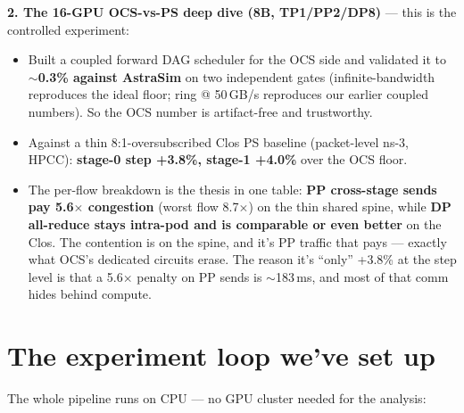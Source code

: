 \documentclass[11pt]{article}
\begin{document}
\textbf{2. The 16-GPU OCS-vs-PS deep dive (8B, TP1/PP2/DP8)} --- this is the controlled experiment:
\begin{itemize}
\item Built a coupled forward DAG scheduler for the OCS side and validated it to \textbf{$\sim$0.3\% against AstraSim} on two independent gates (infinite-bandwidth reproduces the ideal floor; ring @ 50\,GB/s reproduces our earlier coupled numbers). So the OCS number is artifact-free and trustworthy.
\item Against a thin 8:1-oversubscribed Clos PS baseline (packet-level ns-3, HPCC): \textbf{stage-0 step +3.8\%, stage-1 +4.0\%} over the OCS floor.
\item The per-flow breakdown is the thesis in one table: \textbf{PP cross-stage sends pay 5.6$\times$ congestion} (worst flow 8.7$\times$) on the thin shared spine, while \textbf{DP all-reduce stays intra-pod and is comparable or even better} on the Clos. The contention is on the spine, and it's PP traffic that pays --- exactly what OCS's dedicated circuits erase. The reason it's ``only'' +3.8\% at the step level is that a 5.6$\times$ penalty on PP sends is $\sim$183\,ms, and most of that comm hides behind compute.
\end{itemize}

\section*{The experiment loop we've set up}

The whole pipeline runs on CPU --- no GPU cluster needed for the analysis:
\end{document}
